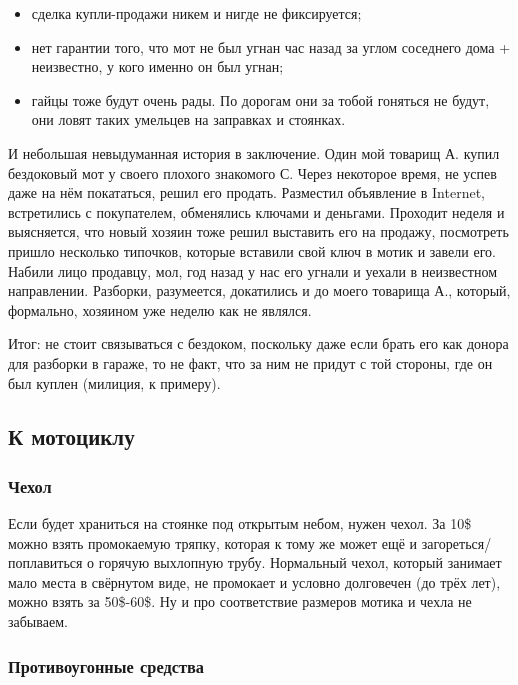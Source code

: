 \documentclass[12pt,a4paper]{article}
\begin{document}
\begin{itemize}
\item сделка купли-продажи никем и нигде не фиксируется;
\item нет гарантии того, что мот не был угнан час назад за углом
соседнего дома + неизвестно, у кого именно он был угнан;
\item гайцы тоже будут очень рады. По дорогам они за тобой гоняться
не будут, они ловят таких умельцев на заправках и стоянках.
\end{itemize}

И небольшая невыдуманная история в заключение. Один мой товарищ А. купил
бездоковый мот у своего плохого знакомого С. Через некоторое время,
не успев даже на нём покататься, решил его продать. Разместил
объявление в Internet, встретились с покупателем, обменялись ключами
и деньгами. Проходит неделя и выясняется, что новый хозяин тоже
решил выставить его на продажу, посмотреть пришло несколько
типочков, которые вставили свой ключ в мотик и завели его. Набили
лицо продавцу, мол, год назад у нас его угнали и уехали в неизвестном
направлении. Разборки, разумеется, докатились и до моего товарища А.,
который, формально, хозяином уже неделю как не являлся.

Итог: не стоит связываться с бездоком, поскольку даже если брать его
как донора для разборки в гараже, то не факт, что за ним не придут с той
стороны, где он был куплен (милиция, к примеру).

\subsection{К мотоциклу}

\subsubsection{Чехол}

Если будет храниться на стоянке под открытым небом, нужен чехол. За
10\$ можно взять промокаемую тряпку, которая к тому же может ещё и
загореться/поплавиться о горячую выхлопную трубу. Нормальный чехол,
который занимает мало места в свёрнутом виде, не промокает и условно
долговечен (до трёх лет), можно взять за 50\$-60\$.
Ну и про соответствие размеров мотика и чехла не забываем.

\subsubsection{Противоугонные средства}
\end{document}
